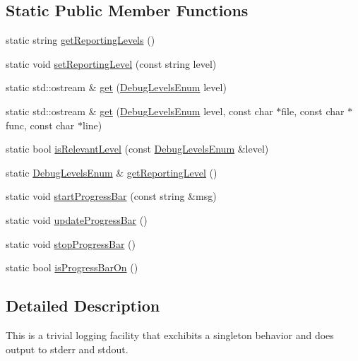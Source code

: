 \subsection*{Static Public Member Functions}
\begin{DoxyCompactItemize}
\item 
static string \hyperlink{classuva_1_1smt_1_1logging_1_1_logger_a21c762988e07657298e025a4df2813e3}{get\+Reporting\+Levels} ()
\item 
static void \hyperlink{classuva_1_1smt_1_1logging_1_1_logger_af07617f0088beaf25775c94202144548}{set\+Reporting\+Level} (const string level)
\item 
static std\+::ostream \& \hyperlink{classuva_1_1smt_1_1logging_1_1_logger_a5bb1dd0d092bd61e4c4691061113f19b}{get} (\hyperlink{namespaceuva_1_1smt_1_1logging_ab82295a1c88a9605285d504893855427}{Debug\+Levels\+Enum} level)
\item 
static std\+::ostream \& \hyperlink{classuva_1_1smt_1_1logging_1_1_logger_a394ef70963a1da4fe09e4e4c26976b6c}{get} (\hyperlink{namespaceuva_1_1smt_1_1logging_ab82295a1c88a9605285d504893855427}{Debug\+Levels\+Enum} level, const char $\ast$file, const char $\ast$func, const char $\ast$line)
\item 
static bool \hyperlink{classuva_1_1smt_1_1logging_1_1_logger_a157296abab3607dd37ddb8c681eeedd2}{is\+Relevant\+Level} (const \hyperlink{namespaceuva_1_1smt_1_1logging_ab82295a1c88a9605285d504893855427}{Debug\+Levels\+Enum} \&level)
\item 
static \hyperlink{namespaceuva_1_1smt_1_1logging_ab82295a1c88a9605285d504893855427}{Debug\+Levels\+Enum} \& \hyperlink{classuva_1_1smt_1_1logging_1_1_logger_aaca1a5457d4515b960d18e840346e020}{get\+Reporting\+Level} ()
\item 
static void \hyperlink{classuva_1_1smt_1_1logging_1_1_logger_ae96e3ce37d5fb146c7d661bf9da7576c}{start\+Progress\+Bar} (const string \&msg)
\item 
static void \hyperlink{classuva_1_1smt_1_1logging_1_1_logger_ac99950b42d9cbe17becae3a68f4b0015}{update\+Progress\+Bar} ()
\item 
static void \hyperlink{classuva_1_1smt_1_1logging_1_1_logger_ae71f997a95aed7402dbad289f7a0ec9f}{stop\+Progress\+Bar} ()
\item 
static bool \hyperlink{classuva_1_1smt_1_1logging_1_1_logger_adc05eba04bec4f3c46414aa6e0dd8610}{is\+Progress\+Bar\+On} ()
\end{DoxyCompactItemize}


\subsection{Detailed Description}
This is a trivial logging facility that exchibits a singleton behavior and does output to stderr and stdout. 

